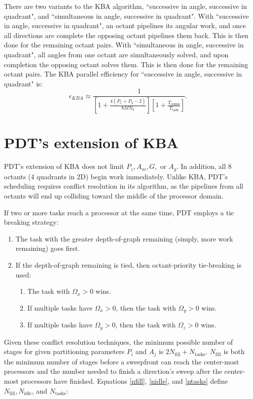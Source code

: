 There are two variants to the KBA algorithm, ``successive in angle, successive in quadrant", and ``simultaneous in angle, successive in quadrant".  With ``successive in angle, successive in quadrant", an octant pipelines its angular work, and once all directions are complete the opposing octant pipelines them back. This is then done for the remaining octant pairs. With ``simultaneous in angle, successive in quadrant", all angles from one octant are simultaneously solved, and upon completion the opposing octant solves them. This is then done for the remaining octant pairs. The KBA parallel efficiency \cite{mpadams2013} for ``successive in angle, successive in quadrant" is:
\begin{equation}
  \epsilon_{KBA} \approx \frac{1}{[1 + \frac{4(P_x+P_y-2)}{8MN_k}][1 + \frac{T_{\text{comm}}}{T_{\text{{task}}}}]}.
  \label{eps_kba}
\end{equation}

\section{PDT's extension of KBA}\label {pdt_extension}

PDT's extension of KBA does not limit $P_z, A_m, G,$ or $A_g$. In addition, all 8 octants (4 quadrants in 2D) begin work immediately. Unlike KBA, PDT's scheduling requires conflict resolution in its algorithm, as the pipelines from all octants will end up colliding toward the middle of the processor domain.

If two or more tasks reach a processor at the same time, PDT employs a tie breaking strategy:

\begin{enumerate}
	\item The task with the greater depth-of-graph remaining (simply, more work remaining) goes first.
	\item If the depth-of-graph remaining is tied, then octant-priority tie-breaking is used:
	\begin{enumerate}
	  \item The task with $\Omega_x > 0$ wins.
	  \item If multiple tasks have $\Omega_x > 0$, then the task with $\Omega_y > 0$ wins.
	  \item If multiple tasks have $\Omega_y > 0$, then the task with $\Omega_z > 0$ wins.
	\end{enumerate}
\end{enumerate}

Given these conflict resolution techniques, the minimum possible number of stages for given partitioning parameters $P_i$ and $A_j$ is $2N_{\text{fill}} + N_{\text{tasks}}$. $N_{\text{fill}}$ is both the minimum number of stages before a sweepfront can reach the center-most processors and the number needed to finish a direction's sweep after the center-most processors have finished. Equations \ref{nfill}, \ref{nidle}, and \ref{ntasks} define $N_{\text{fill}}, N_{\text{idle}}$, and $N_{\text{tasks}}$:

